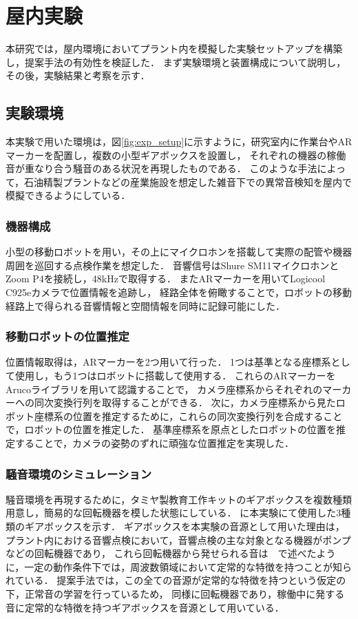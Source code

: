 \documentclass[../main]{subfiles}
\begin{document}
\section{屋内実験} \label{sec:indoor_experiment}

本研究では，屋内環境においてプラント内を模擬した実験セットアップを構築し，提案手法の有効性を検証した．
まず実験環境と装置構成について説明し，その後，実験結果と考察を示す．

\subsection{実験環境} \label{subsec:vexp_ref_environmet}

本実験で用いた環境は，図\ref{fig:exp_setup}に示すように，研究室内に作業台やARマーカーを配置し，複数の小型ギアボックスを設置し，
それぞれの機器の稼働音が重なり合う騒音のある状況を再現したものである．
このような手法によって，石油精製プラントなどの産業施設を想定した雑音下での異常音検知を屋内で模擬できるようにしている．

\subsubsection{機器構成} \label{subsubsec:device_config}

小型の移動ロボットを用い，その上にマイクロホンを搭載して実際の配管や機器周囲を巡回する点検作業を想定した．
音響信号はShure SM11マイクロホンとZoom P4を接続し，48kHzで取得する．
またARマーカーを用いてLogicool C925eカメラで位置情報を追跡し，
経路全体を俯瞰することで，ロボットの移動経路上で得られる音響情報と空間情報を同時に記録可能にした．

\subsubsection{移動ロボットの位置推定}
位置情報取得は，ARマーカーを2つ用いて行った．
1つは基準となる座標系として使用し，もう1つはロボットに搭載して使用する．
これらのARマーカーをArucoライブラリを用いて認識することで，
カメラ座標系からそれぞれのマーカーへの同次変換行列を取得することができる．
次に，カメラ座標系から見たロボット座標系の位置を推定するために，これらの同次変換行列を合成することで，ロボットの位置を推定した．
基準座標系を原点としたロボットの位置を推定することで，カメラの姿勢のずれに頑強な位置推定を実現した．
\subsubsection{騒音環境のシミュレーション} \label{subsubsec:noise_simulation}
騒音環境を再現するために，タミヤ製教育工作キットのギアボックスを複数種類用意し，簡易的な回転機器を模した状態にしている．
に本実験にて使用した3種類のギアボックスを示す．
ギアボックスを本実験の音源として用いた理由は，プラント内における音響点検において，音響点検の主な対象となる機器がポンプなどの回転機器であり，
これら回転機器から発せられる音は　で述べたように，一定の動作条件下では，周波数領域において定常的な特徴を持つことが知られている．
提案手法では，この全ての音源が定常的な特徴を持つという仮定の下，正常音の学習を行っているため，
同様に回転機器であり，稼働中に発する音に定常的な特徴を持つギアボックスを音源として用いている．
\end{document}
